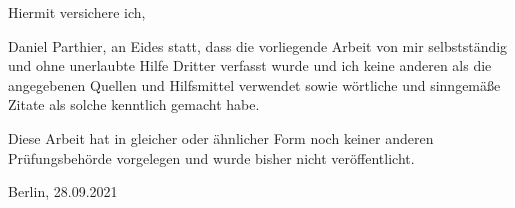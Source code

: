 \documentclass[
  12pt,
  a4paper,
  openany]{book}
\begin{document}
\vspace*{2in}

Hiermit versichere ich,
\vspace{11pt}

\noindent
Daniel Parthier, an Eides statt, dass die vorliegende Arbeit von mir selbstständig und ohne unerlaubte Hilfe Dritter verfasst wurde und ich keine anderen als die angegebenen Quellen und Hilfsmittel verwendet sowie wörtliche und sinngemäße Zitate als solche kenntlich gemacht habe.

\noindent
Diese Arbeit hat in gleicher oder ähnlicher Form noch keiner anderen Prüfungsbehörde vorgelegen und wurde bisher nicht veröffentlicht.
\vspace{24pt}

\noindent
Berlin, 28.09.2021
\vspace*{\fill}
\end{document}
